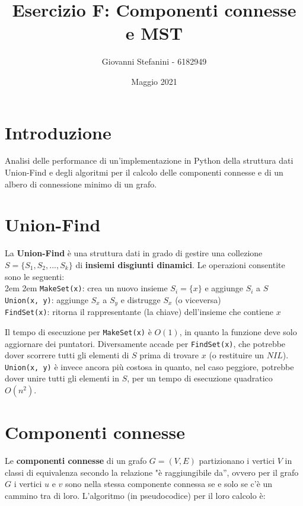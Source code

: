 \documentclass[]{article}
\def\code#1{\texttt{#1}} %
\begin{document}
\title{Esercizio F: Componenti connesse e MST}
\author{Giovanni Stefanini - 6182949}
\date{Maggio 2021}
\maketitle

\section*{Introduzione}
Analisi delle performance di un'implementazione in Python della struttura dati Union-Find e degli algoritmi per il calcolo delle componenti connesse e di un albero di connessione minimo di un grafo.\\

\section {Union-Find}
La {\bf Union-Find} è una struttura dati in grado di gestire una collezione $S = \{ S_1, S_2, ..., S_k \}$ di {\bf insiemi disgiunti dinamici}. Le operazioni consentite sono le seguenti:\\

\begingroup
\leftskip2em \rightskip2em
\noindent \code{MakeSet(x)}: crea un nuovo insieme $S_i = \{ x \}$ e aggiunge $S_i$ a $S$\\
\code{Union(x, y)}: aggiunge $S_x$ a $S_y$ e distrugge $S_x$ (o viceversa)\\
\code{FindSet(x)}: ritorna il rappresentante (la chiave) dell'insieme che contiene $x$
\par
\endgroup

\vspace{0.20in}

Il tempo di esecuzione per \code{MakeSet(x)} è $O(1)$, in quanto la funzione deve solo aggiornare dei puntatori. Diversamente accade per \code{FindSet(x)}, che potrebbe dover scorrere tutti gli elementi di $S$ prima di trovare $x$ (o restituire un $NIL$). \code{Union(x, y)} è invece ancora più costosa in quanto, nel caso peggiore, potrebbe dover unire tutti gli elementi in $S$, per un tempo di esecuzione quadratico $O(n^2)$.

\section {Componenti connesse}
Le {\bf componenti connesse} di un grafo $G = (V,E)$ partizionano i vertici $V$ in classi di equivalenza secondo la relazione "è raggiungibile da'', ovvero per il grafo $G$ i vertici $u$ e $v$ sono nella stessa componente connessa se e solo se c'è un cammino tra di loro. L'algoritmo (in pseudocodice) per il loro calcolo è:\\
\end{document}
